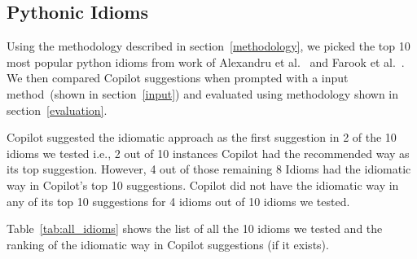 \subsection{Pythonic Idioms}
\label{idioms}
Using the methodology described in section~\ref{methodology}, we picked the top 10 most popular python idioms from work of Alexandru et al.~\cite{Alexandru2018} and Farook et al.~\cite{idioms}. 
We then compared Copilot suggestions when prompted with a input method~(shown in section~\ref{input}) and evaluated using methodology shown in section~\ref{evaluation}. 

Copilot suggested the idiomatic approach as the first suggestion in 2 of the 10 idioms we tested i.e., 2 out of 10 instances Copilot had the recommended way as its top suggestion. However, 4 out of those remaining 8 Idioms had the idiomatic way in Copilot's top 10 suggestions. Copilot did not have the idiomatic way in any of its top 10 suggestions for 4 idioms out of 10 idioms we tested.

Table~\ref{tab:all_idioms} shows the list of all the 10 idioms we tested and the ranking of the idiomatic way in Copilot suggestions (if it exists).

